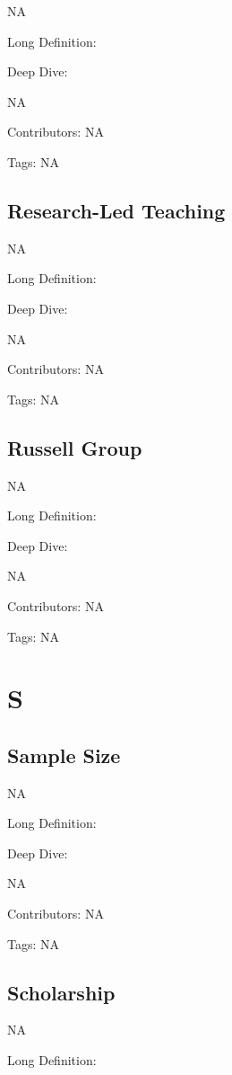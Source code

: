 \documentclass[
  letterpaper,
  DIV=11,
  numbers=noendperiod]{scrreprt}
\begin{document}
NA

Long Definition:

Deep Dive:

NA

Contributors: NA

Tags: NA

\section{Research-Led Teaching}\label{research-led-teaching}

NA

Long Definition:

Deep Dive:

NA

Contributors: NA

Tags: NA

\section{Russell Group}\label{russell-group}

NA

Long Definition:

Deep Dive:

NA

Contributors: NA

Tags: NA


\chapter{S}\label{s}

\section{Sample Size}\label{sample-size}

NA

Long Definition:

Deep Dive:

NA

Contributors: NA

Tags: NA

\section{Scholarship}\label{scholarship}

NA

Long Definition:
\end{document}

